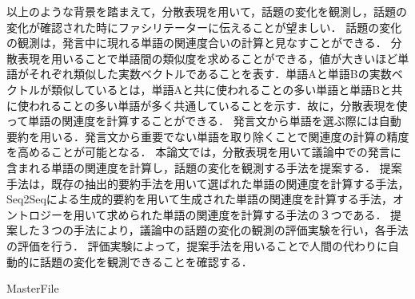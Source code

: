 %
以上のような背景を踏まえて，分散表現を用いて，話題の変化を観測し，話題の変化が確認された時にファシリテーターに伝えることが望ましい．
話題の変化の観測は，発言中に現れる単語の関連度合いの計算と見なすことができる．
分散表現を用いることで単語間の類似度を求めることができる，値が大きいほど単語がそれぞれ類似した実数ベクトルであることを表す．単語Aと単語Bの実数ベクトルが類似しているとは，単語Aと共に使われることの多い単語と単語Bと共に使われることの多い単語が多く共通していることを示す．故に，分散表現を使って単語の関連度を計算することができる．
%
発言文から単語を選ぶ際には自動要約を用いる．発言文から重要でない単語を取り除くことで関連度の計算の精度を高めることが可能となる．
%
本論文では，分散表現を用いて議論中での発言に含まれる単語の関連度を計算し，話題の変化を観測する手法を提案する．
%
提案手法は，既存の抽出的要約手法を用いて選ばれた単語の関連度を計算する手法，Seq2Seqによる生成的要約を用いて生成された単語の関連度を計算する手法，オントロジーを用いて求められた単語の関連度を計算する手法の３つである．
提案した３つの手法により，議論中の話題の変化の観測の評価実験を行い，各手法の評価を行う．
評価実験によって，提案手法を用いることで人間の代わりに自動的に話題の変化を観測できることを確認する．
%
 \begin{comment}
大規模な議論では意見を共有することは可能であるが，議論を整理させることや収束させることは難しい．以上から大規模意見集約システムCOLLAGREEが開発された．本システムではWeb上で適切に大規模な議論を行うことができるように議論をマネジメントするファシリテーターを導入した．
過去の実験ではファシリテーターの存在が議論の集約に大きな役割を果たしていることが認識されており，大規模な議論のためにファシリテータは必要である．しかし，議論の規模に伴って議論時間が長くなる傾向があり，同時にファシリテーターは常に議論の動向を見続ける必要がある．故に，議論の規模が大きくなればなるほどファシリテーターは長時間かつ大規模な議論の動向の監視によって大きな負担がかかる．大規模な議論が増加する傾向を踏まえるとファシリテーターにかかる負担を軽減する支援が必要となることは明白である．
また，近年自然言語処理の分野において分散表現が多くの研究で使われており，機械翻訳を始めとする複数の分野で精度の向上が確認されている．まだ適応されていない分野でも結果の向上が期待できる．
従って，本研究では負担軽減の１つとして分散表現を用いて議論中での話題の変化を人間の代わりに検知することでファシリテーターの負担を軽減することを目指す．
-----------------

\end{comment}
\expandafter\ifx\csname MasterFile\endcsname\relax

\fi
